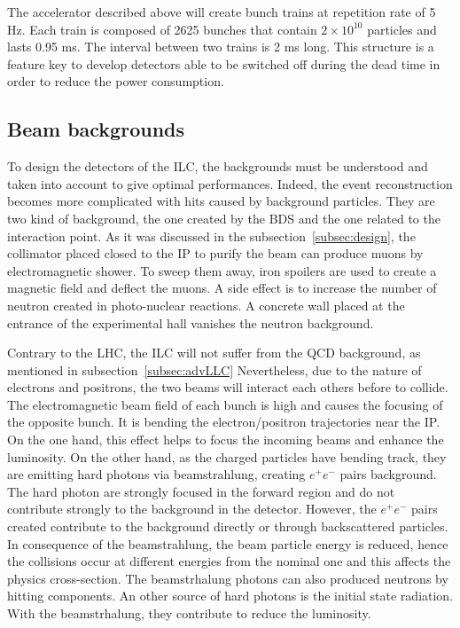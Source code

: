     The accelerator described above will create bunch trains at repetition rate of 5 Hz. 
    Each train is composed of 2625 bunches that contain $2\times 10^{10}$ particles and lasts 0.95 ms. 
    The interval between two trains is 2 ms long. 
    This structure is a feature key to develop detectors able to be switched off during the dead time in order to reduce the power consumption.

    \subsection{Beam backgrounds}

    To design the detectors of the \gls{ILC}, the backgrounds must be understood and taken into account to give optimal performances.
    Indeed, the event reconstruction becomes more complicated with hits caused by background particles.
    They are two kind of background, the one created by the \gls{BDS} and the one related to the interaction point.
    As it was discussed in the subsection~\ref{subsec:design}, the collimator placed closed to the \gls{IP} to purify the beam can produce muons by electromagnetic shower.
    To sweep them away, iron spoilers are used to create a magnetic field and deflect the muons.
    A side effect is to increase the number of neutron created in photo-nuclear reactions.
    A concrete wall placed at the entrance of the experimental hall vanishes the neutron background.

    Contrary to the \gls{LHC}, the \gls{ILC} will not suffer from the QCD background, as mentioned in subsection~\ref{subsec:advLLC}
    Nevertheless, due to the nature of electrons and positrons, the two beams will interact each others before to collide.
    The electromagnetic beam field of each bunch is high and causes the focusing of the opposite bunch.
    It is bending the electron/positron trajectories near the \gls{IP}.
    On the one hand, this effect helps to focus the incoming beams and enhance the luminosity.
    On the other hand, as the charged particles have bending track, they are emitting hard photons via beamstrahlung, creating $e^+e^-$ pairs background.
    The hard photon are strongly focused in the forward region and do not contribute strongly to the background in the detector.
    However, the $e^+e^-$ pairs created contribute to the background directly or through backscattered particles.
    In consequence of the beamstrahlung, the beam particle energy is reduced, hence the collisions occur at different energies from the nominal one and this affects the physics cross-section.
    The beamstrhalung photons can also produced neutrons by hitting components.
    An other source of hard photons is the initial state radiation. 
    With the beamstrhalung, they contribute to reduce the luminosity\cite{Markin2014}.

